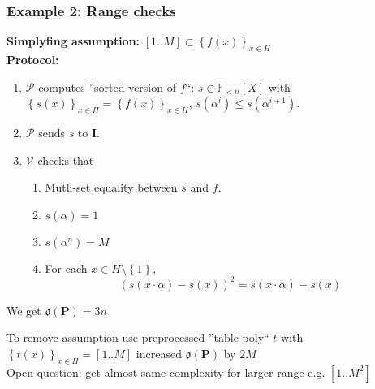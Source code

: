 \documentclass[shadesubsections,compress,14pt,mathserif]{beamer}
\newcommand{\prot}{\mathbf{P}}
\newcommand{\aggdeg}[1]{\mathfrak{d}(#1)}
\newcommand{\F}{\ensuremath{\mathbb F}}
\newcommand{\set}[1]{\ensuremath{\left\{#1\right\}}}
\newcommand{\sett}[2]{\ensuremath{\left\{#1\right\}_{#2}}}
\newcommand{\ver}{\ensuremath{\mathcal{V}}}
\newcommand{\prv}{\ensuremath{\mathcal{P}}}
\newcommand{\polysofdeg}[1]{\F_{< #1}[X]}
\newcommand{\ideal}{\mathbf{I}}
\begin{document}
\begin{frame}
\frametitle{Example 2: Range checks}

\textbf{Simplyfing assumption:} $[1..M]\subset \sett{f(x)}{x\in H}$\\ \pause
\textbf{Protocol:}
 \begin{enumerate}
 \item $\prv$ computes ''sorted version of $f$``: $s\in \polysofdeg{n}$ with
 $\sett{s(x)}{x\in H}=\sett{f(x)}{x\in H}$, $s(\alpha^i)\leq s(\alpha^{i+1})$.\pause
 \item $\prv$ sends $s$ to $\ideal$.\pause
 \item $\ver$ checks that
 \begin{enumerate}
  \item Mutli-set equality between $s$ and $f$.\pause
  \item $s(\alpha)=1$
  \item $s(\alpha^n) = M$\pause
  \item For each $x\in H\setminus \set{1}$,\pause
  \[ (s(x\cdot \alpha) - s(x))^2 = s(x\cdot \alpha) - s(x)\]
 \end{enumerate}

\end{enumerate}


We get $\aggdeg{\prot}=3n$ \\
\end{frame}
\begin{frame}
To remove assumption use preprocessed ''table poly`` $t$ with $\sett{t(x)}{x\in H}=[1..M]$
increased  $\aggdeg{\prot}$ by $2M$\\
 \vspace{0.2in}
Open question: get almost same complexity for larger range e.g. $[1..M^2]$ 



\end{frame}
\end{document}
